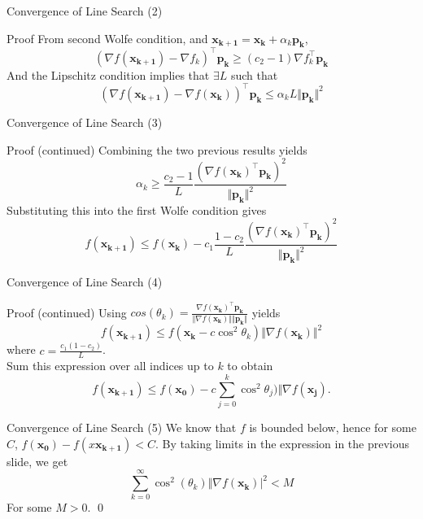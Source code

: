 \documentclass{beamer}
\begin{document}
    \begin{frame}{Convergence of Line Search (2)}
        \begin{alertblock}{Proof}
            From second Wolfe condition, and $\mathbf{x_{k+1}} = \mathbf{x_k} + \alpha_k \mathbf{p_k}$, 
            $$(\nabla f(\mathbf{x_{k+1}}) - \nabla f_k)^\top \mathbf{p_k} \geq (c_2 - 1)\nabla f_k^\top \mathbf{p_k}$$
            And the Lipschitz condition implies that $\exists L$ such that
            $$(\nabla f(\mathbf{x_{k+1}}) - \nabla f(\mathbf{x_k}))^\top \mathbf{p_k} \leq \alpha_k L \Vert \mathbf{p_k} \Vert^2$$
        \end{alertblock}
    \end{frame}

    \begin{frame}{Convergence of Line Search (3)}
        \begin{alertblock}{Proof (continued)}
            Combining the two previous results yields
            $$\alpha_k \geq \frac{c_2-1}{L} \frac{(\nabla f(\mathbf{x_k})^\top \mathbf{p_k})^2}{\Vert \mathbf{p_k}\Vert^2} $$
            Substituting this into the first Wolfe condition gives
            $$f(\mathbf{x_{k+1}}) \leq f(\mathbf{x_k}) - c_1 \frac{1-c_2}{L} \frac{(\nabla f(\mathbf{x_k})^\top\mathbf{p_k})^2}{\Vert \mathbf{p_k}\Vert^2}$$  
        \end{alertblock}
    \end{frame}

    \begin{frame}{Convergence of Line Search (4)}

        \begin{alertblock}{Proof (continued)}
            Using $cos(\theta_k) = \frac{\nabla f(\mathbf{x_k})^\top\mathbf{p_k}}{\Vert \nabla f(\mathbf{x_k}) \Vert \Vert \mathbf{p_k} \Vert}$
            yields $$f(\mathbf{x_{k+1}}) \leq f(\mathbf{x_k} - c\cos^2{\theta_k}) \Vert \nabla f(\mathbf{x_k}) \Vert^2$$ where $c = \frac{c_1(1-c_2)}{L}$. \\
            Sum this expression over all indices up to $k$ to obtain 
            $$ f(\mathbf{x_{k+1}}) \leq f(\mathbf{x_0}) - c \sum_{j=0}^k \cos^2{\theta_j}) \Vert \nabla f(\mathbf{x_j}).$$
        \end{alertblock}
    \end{frame}

    \begin{frame}{Convergence of Line Search (5)}
        We know that $f$ is bounded below, hence for some $C$, $f({\mathbf{x_0}}) - f(x\mathbf{x_{k+1}}) < C$. By taking limits in the expression in the previous slide, we get 
        $$\sum_{k=0}^{\infty} \cos^2(\theta_k) \Vert \nabla f(\mathbf{x_{k}}) \vert ^2 < M$$
        For some $M > 0$. \qed
    \end{frame}
\end{document}

